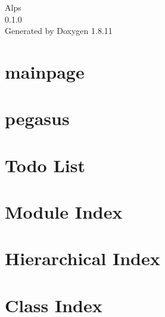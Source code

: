 \documentclass[twoside]{book}
\newcommand{\+}{\discretionary{\mbox{\scriptsize$\hookleftarrow$}}{}{}}
\newcommand{\clearemptydoublepage}{%
  \newpage{\pagestyle{empty}\cleardoublepage}%
}
\begin{document}
\hypersetup{pageanchor=false,
             bookmarksnumbered=true,
             pdfencoding=unicode
            }
\begin{titlepage}
\vspace*{7cm}
\begin{center}%
{\Large Alps \\[1ex]\large 0.\+1.\+0 }\\
\vspace*{1cm}
{\large Generated by Doxygen 1.8.11}\\
\end{center}
\end{titlepage}
\clearemptydoublepage
\tableofcontents
\clearemptydoublepage
{}
\hypersetup{pageanchor=true}

\chapter{mainpage}
\label{md__home_yuan_Benchmarks_whisper_mnemosyne-gcc_usermode_library_pmalloc_include_alps_src_mainpage}
\hypertarget{md__home_yuan_Benchmarks_whisper_mnemosyne-gcc_usermode_library_pmalloc_include_alps_src_mainpage}{}

\chapter{pegasus}
\label{md__home_yuan_Benchmarks_whisper_mnemosyne-gcc_usermode_library_pmalloc_include_alps_src_pegasus_pegasus}
\hypertarget{md__home_yuan_Benchmarks_whisper_mnemosyne-gcc_usermode_library_pmalloc_include_alps_src_pegasus_pegasus}{}

\chapter{Todo List}
\label{todo}
\hypertarget{todo}{}

\chapter{Module Index}

\chapter{Hierarchical Index}

\chapter{Class Index}

\end{document}
